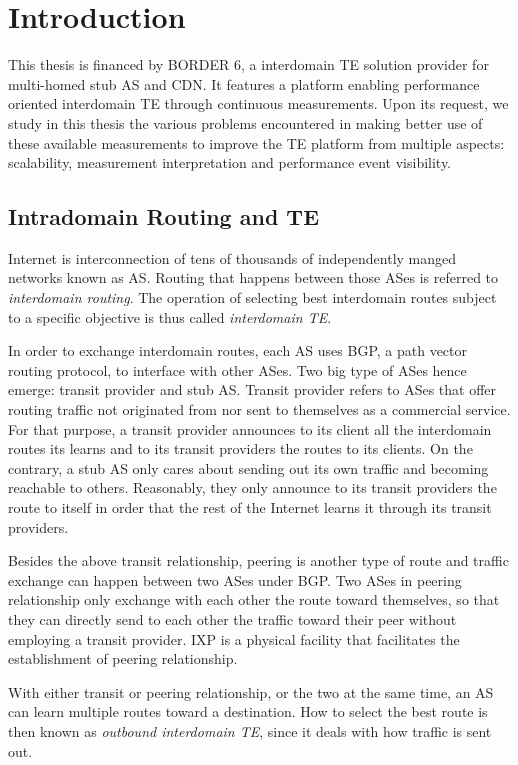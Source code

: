 \chapter{Introduction}
\label{sec:intro}

This thesis is financed by BORDER 6, a interdomain \acf{TE} solution provider for multi-homed stub \acf{AS} and \acf{CDN}. 
It features a platform enabling performance oriented interdomain TE through continuous measurements.
Upon its request, we study in this thesis the various problems encountered in making better use of these available measurements to improve the TE platform from multiple aspects: scalability, measurement interpretation and performance event visibility.

\section{Intradomain Routing and TE}
Internet is interconnection of tens of thousands of independently manged networks known as \acf{AS}.
Routing that happens between those ASes is referred to \textit{interdomain routing}.
The operation of selecting best interdomain routes subject to a specific objective is thus called \textit{interdomain TE}.

In order to exchange interdomain routes, each AS uses \acf{BGP}, a path vector routing protocol, to interface with other ASes.  
Two big type of ASes hence emerge: transit provider and stub AS.
Transit provider refers to ASes that offer routing traffic not originated from nor sent to themselves as a commercial service.
For that purpose, a transit provider announces to its client all the interdomain routes its learns and to its transit providers the routes to its clients.
On the contrary, a stub AS only cares about sending out its own traffic and becoming reachable to others.
Reasonably, they only announce to its transit providers the route to itself in order that the rest of the Internet learns it through its transit providers.

Besides the above transit relationship, peering is another type of route and traffic exchange can happen between two ASes under BGP. Two ASes in peering relationship only exchange with each other the route toward themselves, so that they can directly send to each other the traffic toward their peer without employing a transit provider.
\acf{IXP} is a physical facility that facilitates the establishment of peering relationship.

With either transit or peering relationship, or the two at the same time, an AS can learn multiple routes toward a destination. How to select the best route is then known as \textit{outbound interdomain TE}, since it deals with how traffic is sent out. 


